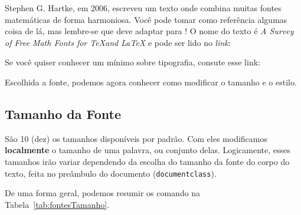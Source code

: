 Stephen G. Hartke, em 2006, escreveu um texto onde combina muitas fontes matemáticas 
de forma harmoniosa.
Você pode tomar como referência algumas coisa de lá, mas lembre-se que deve adaptar 
para !
O nome do texto é \textit{A Survey of Free Math Fonts for \TeX and \LaTeX} e 
pode ser lido no \textit{link}:


Se você quiser conhecer um mínimo sobre tipografia, consute esse link:


Escolhida a fonte, podemos agora conhecer como modificar o \textsf{tamanho} e o
\textsf{estilo}.

\subsection{Tamanho da Fonte}

São 10 (dez) os tamanhos disponíveis por padrão.
Com eles modificamos \textbf{localmente} o tamanho de uma palavra, ou conjunto delas.
Logicamente, esses tamanhos irão variar dependendo da escolha do tamanho da fonte
do corpo do texto, feita no preâmbulo do documento (\Verb|documentclass|).

De uma forma geral, podemos resumir os comando na Tabela~\ref{tab:fontesTamanho}.

